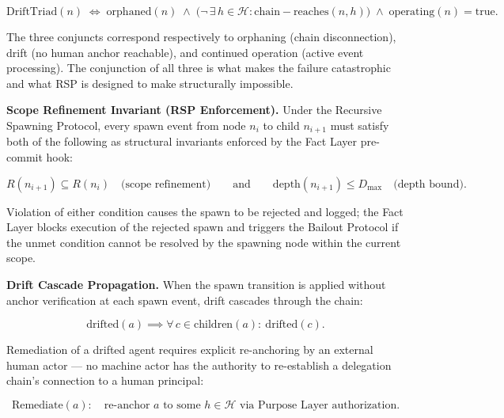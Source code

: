 \begin{equation}
\mathrm{DriftTriad}(n) \;\iff\; \mathrm{orphaned}(n) \;\land\; \bigl( \neg\,\exists\, h \in \mathcal{H} : \mathrm{chain-reaches}(n, h) \bigr) \;\land\; \mathrm{operating}(n) = \mathrm{true}.
\label{eq:rs-drift-condition}
\end{equation}

The three conjuncts correspond respectively to orphaning (chain disconnection), drift (no human anchor reachable), and continued operation (active event processing). The conjunction of all three is what makes the failure catastrophic and what RSP is designed to make structurally impossible.

\medskip
\noindent\textbf{Scope Refinement Invariant (RSP Enforcement).}
Under the Recursive Spawning Protocol, every spawn event from node $n_i$ to child $n_{i+1}$ must satisfy both of the following as structural invariants enforced by the Fact Layer pre-commit hook:

\begin{equation}
R(n_{i+1}) \subseteq R(n_i) \quad \text{(scope refinement)} \qquad \text{and} \qquad \mathrm{depth}(n_{i+1}) \leq D_{\max} \quad \text{(depth bound)}.
\label{eq:rs-scope-refinement}
\end{equation}

Violation of either condition causes the spawn to be rejected and logged; the Fact Layer blocks execution of the rejected spawn and triggers the Bailout Protocol if the unmet condition cannot be resolved by the spawning node within the current scope.

\medskip
\noindent\textbf{Drift Cascade Propagation.}
When the spawn transition is applied without anchor verification at each spawn event, drift cascades through the chain:

\begin{equation}
\mathrm{drifted}(a) \implies \forall\, c \in \mathrm{children}(a):\ \mathrm{drifted}(c).
\label{eq:rs-drift-propagation}
\end{equation}

Remediation of a drifted agent requires explicit re-anchoring by an external human actor — no machine actor has the authority to re-establish a delegation chain's connection to a human principal:

\begin{equation}
\mathrm{Remediate}(a):\quad \text{re-anchor } a \text{ to some } h \in \mathcal{H} \text{ via Purpose Layer authorization.}
\label{eq:rs-drift-remediation}
\end{equation}

